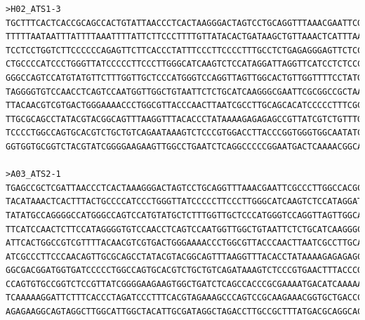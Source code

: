 \begin{verbatim}
>H02_ATS1-3
TGCTTTCACTCACCGCAGCCACTGTATTAACCCTCACTAAGGGACTAGTCCTGCAGGTTTAAACGAATTCGCCCTTGGCCACGCGTCGACTAGTACTTTTTTTTTTTTTTTTTTTTTGGT
TTTTTAATAATTTATTTTAAATTTTATTCTTCCCTTTTGTTATACACTGATAAGCTGTTAAACTCATTTAAATATTTTTTAAAAAATTATCTTATCTATTTGCATTCCAAATCTTGTTCC
TCCTCCTGGTCTTCCCCCCAGAGTTCTTCACCCTATTTCCCTTCCCCTTTGCCTCTGAGAGGGAGTTCTCCCACCCACCCCAAATGACCCACCCACCCATCCCCACCTCACCTCACTTTA
CTGCCCCATCCCTGGGTTATCCCCCTTCCCTTGGGCATCAAGTCTCCATAGGATTAGGTTCATCCTCTCCCATTGAGGCTAGACAAAGCAGTTCTCTGCTACATATATGCCAGGGGCCAT
GGGCCAGTCCATGTATGTTCTTTGGTTGCTCCCATGGGTCCAGGTTAGTTGGCACTGTTGGTTTTCCTATGGTAGTTGCCATCACCTTCAGTTCTTTCAATCCTTCATCCAACTCTTCCA
TAGGGGTGTCCAACCTCAGTCCAATGGTTGGCTGTAATTCTCTGCATCAAGGGCGAATTCGCGGCCGCTAAATTCAATTCGCCCTATAGTGAGTCGTATTACAATTCACTGGCCGTCGTT
TTACAACGTCGTGACTGGGAAAACCCTGGCGTTACCCAACTTAATCGCCTTGCAGCACATCCCCCTTTCGCCAGCTGGCGTAATAGCGAAGAGGCCCGCACCGATCGCCCTTCCCAACAG
TTGCGCAGCCTATACGTACGGCAGTTTAAGGTTTACACCCTATAAAAGAGAGAGCCGTTATCGTCTGTTTGTGGGATGTACAGAGTGATATTATTGACACGCCGGGGCGACGGATGGTGA
TCCCCTGGCCAGTGCACGTCTGCTGTCAGAATAAAGTCTCCCGTGGACCTTACCCGGTGGGTGGCAATATCGGGGGATGGAAAGGCTGGGCGGCATGGATGGACCACCCGATATGGGCAA
GGTGGTGCGGTCTACGTATCGGGGAAGAAGTTGGCCTGAATCTCAGGCCCCCGGAATGACTCAAAACGGCATTACCTGAATGGTTTCTTGA

>A03_ATS2-1
TGAGCCGCTCGATTAACCCTCACTAAAGGGACTAGTCCTGCAGGTTTAAACGAATTCGCCCTTGGCCACGCGTCGACTAGTACTTTTTTTTTTTTTTTTTTGTGTTTGTCAAATCCCATT
TACATAAACTCACTTTACTGCCCCATCCCTGGGTTATCCCCCTTCCCTTGGGCATCAAGTCTCCATAGGATTAGGTTCATCCTCTCCCACTGAGGCTAGACAAAGCAGTTCTCTGCTACA
TATATGCCAGGGGCCATGGGCCAGTCCATGTATGCTCTTTGGTTGCTCCCATGGGTCCAGGTTAGTTGGCACTGTTGGTTTTCCTATGGTAGTTGCCATCACCTTCAGTTCTTTCAATCC
TTCATCCAACTCTTCCATAGGGGTGTCCAACCTCAGTCCAATGGTTGGCTGTAATTCTCTGCATCAAGGGCGAATTCGCGGCCGCTAAATTCAATTCGCCCTATAGTGAGTCGTATTACA
ATTCACTGGCCGTCGTTTTACAACGTCGTGACTGGGAAAACCCTGGCGTTACCCAACTTAATCGCCTTGCAGCACATCCCCCTTTCGCCAGCTGGCGTAATAGCGAAGAGGCCCGCACCG
ATCGCCCTTCCCAACAGTTGCGCAGCCTATACGTACGGCAGTTTAAGGTTTACACCTATAAAAGAGAGAGCCGTTATCGTCTGTTTGTGGATGTACAGAGTGATATTATTGACACGCCGG
GGCGACGGATGGTGATCCCCCTGGCCAGTGCACGTCTGCTGTCAGATAAAGTCTCCCGTGAACTTTACCCGGTGGTGCATATCGGGGATGAAAGCTGGCGCATGATGACCACCGATATGG
CCAGTGTGCCGGTCTCCGTTATCGGGGAAGAAGTGGCTGATCTCAGCCACCCGCGAAAATGACATCAAAAACGCCATTAACCTGATGTTCTGGGGAATATAAATGTCAGGCATGAGATTA
TCAAAAAGGATTCTTTCACCCTAGATCCCTTTCACGTAGAAAGCCCAGTCCGCAAGAAACGGTGCTGACCCCGAATGAATGTCAGCTACTGGGCTATTCTGACAAGGAAACCGCAGCGCA
AGAGAAGGCAGTAGGCTTGGCATTGGCTACATTGCGATAGGCTAGACCTTGCCGCTTTATGACGCAGGCACCAGAGTGCCAGCCTAGTGGGGCGC


\end{verbatim}
